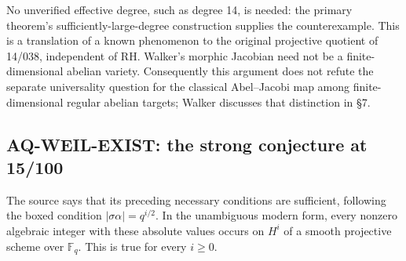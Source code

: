 \documentclass[11pt,a4paper]{article}
\theoremstyle{definition}\newtheorem{definition}[theorem]{Definition}
\theoremstyle{remark}\newtheorem{remark}[theorem]{Remark}
\begin{document}
No unverified effective degree, such as degree 14, is
needed: the primary theorem's sufficiently-large-degree
construction supplies the counterexample. This is a
translation of a known phenomenon to the original
projective quotient of 14/038, independent of RH.
Walker's morphic Jacobian
need not be a finite-dimensional abelian variety.
Consequently this argument does not refute the separate
universality question for the classical Abel--Jacobi
map among finite-dimensional regular abelian targets;
Walker discusses that distinction in \S7.

\subsection{AQ-WEIL-EXIST: the strong conjecture at 15/100}
The source says that its preceding necessary conditions
are sufficient, following the boxed condition
$|\sigma\alpha|=q^{i/2}$. In the unambiguous modern form,
every nonzero algebraic integer with these absolute values
occurs on $H^i$ of a smooth projective scheme over
$\mathbb F_q$. This is true for every $i\geq0$.
\end{document}
